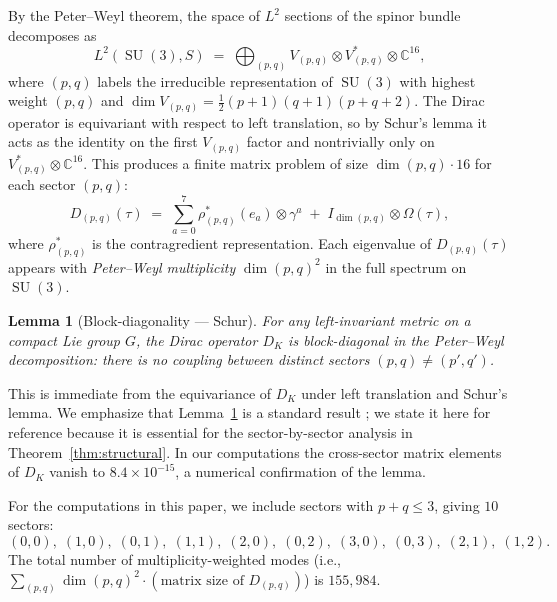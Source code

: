 \documentclass[12pt]{article}
\newtheorem{lemma}[theorem]{Lemma}
\theoremstyle{definition}
\theoremstyle{remark}
\DeclareMathOperator{\SU}{SU}
\begin{document}
By the Peter--Weyl theorem, the space of $L^2$ sections of the spinor
bundle decomposes as
\begin{equation}\label{eq:peter-weyl}
  L^2(\SU(3), S) \;=\; \bigoplus_{(p,q)} V_{(p,q)} \otimes V_{(p,q)}^*
  \otimes \mathbb{C}^{16},
\end{equation}
where $(p,q)$ labels the irreducible representation of $\SU(3)$ with
highest weight $(p,q)$ and $\dim V_{(p,q)} = \tfrac{1}{2}(p+1)(q+1)(p+q+2)$.
The Dirac operator is equivariant with respect to left translation, so
by Schur's lemma it acts as the identity on the first $V_{(p,q)}$
factor and nontrivially only on $V_{(p,q)}^* \otimes \mathbb{C}^{16}$.
This produces a finite matrix problem of size
$\dim(p,q) \cdot 16$ for each sector $(p,q)$:
\begin{equation}\label{eq:dirac-sector}
  D_{(p,q)}(\tau) \;=\; \sum_{a=0}^{7}
  \rho_{(p,q)}^*(e_a) \otimes \gamma^a
  \;+\; I_{\dim(p,q)} \otimes \Omega(\tau),
\end{equation}
where $\rho_{(p,q)}^*$ is the contragredient representation.  Each
eigenvalue of $D_{(p,q)}(\tau)$ appears with \emph{Peter--Weyl
multiplicity} $\dim(p,q)^2$ in the full spectrum on $\SU(3)$.

\begin{lemma}[Block-diagonality --- Schur]\label{lem:block-diag}
For any left-invariant metric on a compact Lie group $G$, the Dirac
operator $D_K$ is block-diagonal in the Peter--Weyl decomposition:
there is no coupling between distinct sectors $(p,q) \neq (p',q')$.
\end{lemma}

This is immediate from the equivariance of $D_K$ under left translation
and Schur's lemma.  We emphasize that Lemma~\ref{lem:block-diag} is a
standard result \cite{Fegan1987, Slebarski1985};
we state it here for reference because it is essential for the
sector-by-sector analysis in Theorem~\ref{thm:structural}.  In our
computations the cross-sector matrix elements of $D_K$ vanish to
$8.4 \times 10^{-15}$, a numerical confirmation of the lemma.

For the computations in this paper, we include sectors with
$p + q \leq 3$, giving $10$ sectors:
\begin{equation}\label{eq:sectors}
  (0,0),\; (1,0),\; (0,1),\; (1,1),\; (2,0),\; (0,2),\;
  (3,0),\; (0,3),\; (2,1),\; (1,2).
\end{equation}
The total number of multiplicity-weighted modes (i.e.,
$\sum_{(p,q)} \dim(p,q)^2 \cdot (\text{matrix size of }
D_{(p,q)})$) is $155{,}984$.
\end{document}

